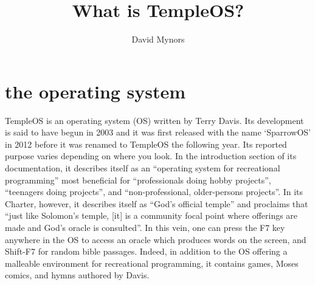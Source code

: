 \documentclass[a4paper]{article}
\author{David Mynors}
\title{What is TempleOS?}
\begin{document}
\section*{the operating system}

TempleOS is an operating system (OS) written by Terry Davis.
Its development is said to have begun in 2003
and it was first released with the name `SparrowOS' in 2012
before it was renamed to TempleOS the following year.
Its reported purpose varies depending on where you look.
In the introduction section of its documentation, it describes itself as
an ``operating system for recreational programming'' most beneficial for
``professionals doing hobby projects'', ``teenagers doing projects'',
and ``non-professional, older-persons projects''.
In its Charter, however, it describes itself as ``God's official temple''
and proclaims that
``just like Solomon’s temple, [it] is a community focal point
where offerings are made and God’s oracle is consulted''.
In this vein, one can press the F7 key anywhere in the OS
to access an oracle which produces words on the screen,
and Shift-F7 for random bible passages.
Indeed, in addition to the OS offering
a malleable environment for recreational programming,
it contains games, Moses comics, and hymns authored by Davis.
\end{document}
